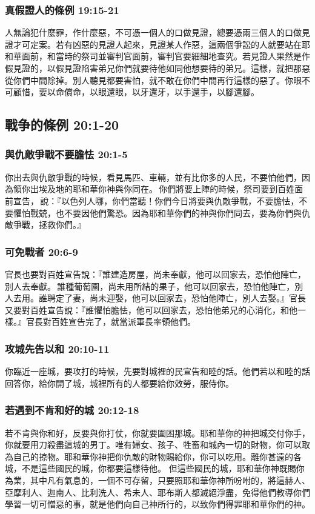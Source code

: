 \subsubsection{真假證人的條例 19:15-21 }
人無論犯什麼罪，作什麼惡，不可憑一個人的口做見證，總要憑兩三個人的口做見證才可定案。若有凶惡的見證人起來，見證某人作惡，這兩個爭訟的人就要站在耶和華面前，和當時的祭司並審判官面前，審判官要細細地查究。若見證人果然是作假見證的，以假見證陷害弟兄你們就要待他如同他想要待的弟兄。這樣，就把那惡從你們中間除掉。別人聽見都要害怕，就不敢在你們中間再行這樣的惡了。你眼不可顧惜，要以命償命，以眼還眼，以牙還牙，以手還手，以腳還腳。

\subsection{戰争的條例 20:1-20 }
\subsubsection{與仇敵爭戰不要膽怯 20:1-5}
你出去與仇敵爭戰的時候，看見馬匹、車輛，並有比你多的人民，不要怕他們，因為領你出埃及地的耶和華你神與你同在。 你們將要上陣的時候，祭司要到百姓面前宣告， 說：『以色列人哪，你們當聽！你們今日將要與仇敵爭戰，不要膽怯，不要懼怕戰兢，也不要因他們驚恐。因為耶和華你們的神與你們同去，要為你們與仇敵爭戰，拯救你們。』

\subsubsection{可免戰者 20:6-9}
官長也要對百姓宣告說：『誰建造房屋，尚未奉獻，他可以回家去，恐怕他陣亡，別人去奉獻。 誰種葡萄園，尚未用所結的果子，他可以回家去，恐怕他陣亡，別人去用。誰聘定了妻，尚未迎娶，他可以回家去，恐怕他陣亡，別人去娶。』官長又要對百姓宣告說：『誰懼怕膽怯，他可以回家去，恐怕他弟兄的心消化，和他一樣。』官長對百姓宣告完了，就當派軍長率領他們。

\subsubsection{攻城先告以和 20:10-11}
你臨近一座城，要攻打的時候，先要對城裡的民宣告和睦的話。他們若以和睦的話回答你，給你開了城，城裡所有的人都要給你效勞，服侍你。

\subsubsection{若遇到不肯和好的城 20:12-18}
若不肯與你和好，反要與你打仗，你就要圍困那城。耶和華你的神把城交付你手，你就要用刀殺盡這城的男丁。唯有婦女、孩子、牲畜和城內一切的財物，你可以取為自己的掠物。耶和華你神把你仇敵的財物賜給你，你可以吃用。離你甚遠的各城，不是這些國民的城，你都要這樣待他。
但這些國民的城，耶和華你神既賜你為業，其中凡有氣息的，一個不可存留，只要照耶和華你神所吩咐的，將這赫人、亞摩利人、迦南人、比利洗人、希未人、耶布斯人都滅絕淨盡，免得他們教導你們學習一切可憎惡的事，就是他們向自己神所行的，以致你們得罪耶和華你們的神。

